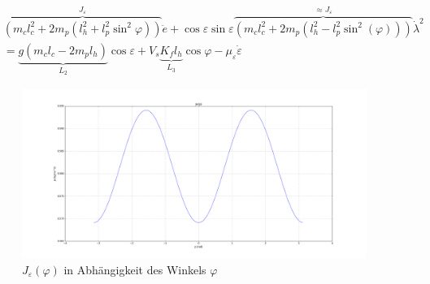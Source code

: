 \documentclass[times, 10pt,twocolumn]{article}
\begin{document}
	\begin{equation}
	\begin{split}
	&\overbrace{(m_cl_c^2+ 2 m_p(l_h^2+l_p^2\sin^2 \varphi))}^{J_\varepsilon}\ddot{e} + \cos \varepsilon \sin \varepsilon \overbrace{(m_c l_c^2 + 2 m_p ( l_h^2 -l_p^2 \sin^2 (\varphi) ))}^{\approx J_\varepsilon} \dot{\lambda}^2 \\
	&= \underbrace{g(m_c l_c - 2 m_p l_h)}_{L_2} \cos \varepsilon + V_s \underbrace{ K_f l_h}_{L_3}  \cos \varphi  - \mu_\varepsilon \dot{\varepsilon}
	\end{split}
	\end{equation}
	\begin{figure}[ht]
		\centering
		\includegraphics[width=1\textwidth]{images/J_e}
		\caption{$J_\varepsilon(\varphi)$ in Abhängigkeit des Winkels $\varphi$}
		\label{fig:J_e}
	\end{figure}
\end{document}
